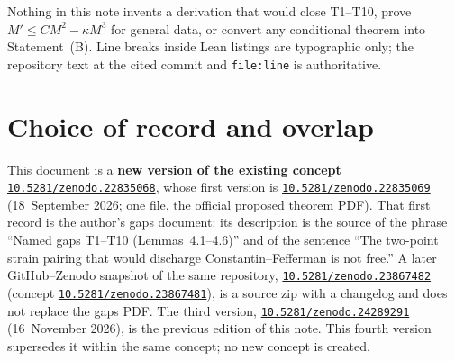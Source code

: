 \documentclass[11pt]{article}
\theoremstyle{plain}
\theoremstyle{definition}
\theoremstyle{remark}
\newcommand{\doi}[1]{\href{https://doi.org/#1}{\texttt{#1}}}
\begin{document}
Nothing in this note invents a derivation that would close T1--T10, prove \(M'\le C M^{2}-\kappa M^{3}\) for general data, or convert any conditional theorem into Statement~(B). Line breaks inside Lean listings are typographic only; the repository text at the cited commit and \texttt{file:line} is authoritative.

\section{Choice of record and overlap}

This document is a \textbf{new version of the existing concept} \doi{10.5281/zenodo.22835068}, whose first version is \doi{10.5281/zenodo.22835069} (18~September 2026; one file, the official proposed theorem PDF). That first record is the author's gaps document: its description is the source of the phrase ``Named gaps T1--T10 (Lemmas~4.1--4.6)'' and of the sentence ``The two-point strain pairing that would discharge Constantin--Fefferman is not free.'' A later GitHub--Zenodo snapshot of the same repository, \doi{10.5281/zenodo.23867482} (concept \doi{10.5281/zenodo.23867481}), is a source zip with a changelog and does not replace the gaps PDF. The third version, \doi{10.5281/zenodo.24289291} (16~November 2026), is the previous edition of this note. This fourth version supersedes it within the same concept; no new concept is created.
\end{document}
